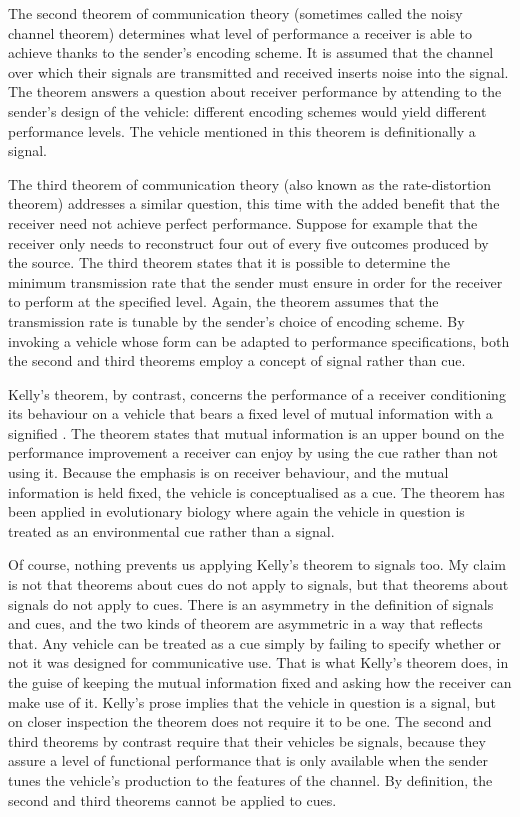 The second theorem of communication theory (sometimes called the noisy channel theorem) determines what level of performance a receiver is able to achieve thanks to the sender's encoding scheme.
It is assumed that the channel over which their signals are transmitted and received inserts noise into the signal.
The theorem answers a question about receiver performance by attending to the sender's design of the vehicle: different encoding schemes would yield different performance levels.
The vehicle mentioned in this theorem is definitionally a signal.

The third theorem of communication theory (also known as the rate-distortion theorem) addresses a similar question, this time with the added benefit that the receiver need not achieve perfect performance.
Suppose for example that the receiver only needs to reconstruct four out of every five outcomes produced by the source.
The third theorem states that it is possible to determine the minimum transmission rate that the sender must ensure in order for the receiver to perform at the specified level.
Again, the theorem assumes that the transmission rate is tunable by the sender's choice of encoding scheme.
By invoking a vehicle whose form can be adapted to performance specifications, both the second and third theorems employ a concept of signal rather than cue.

Kelly's theorem, by contrast, concerns the performance of a receiver conditioning its behaviour on a vehicle that bears a fixed level of mutual information with a signified \citep{kelly1956new}.
The theorem states that mutual information is an upper bound on the performance improvement a receiver can enjoy by using the cue rather than not using it.
Because the emphasis is on receiver behaviour, and the mutual information is held fixed, the vehicle is conceptualised as a cue.
The theorem has been applied in evolutionary biology \citep{donaldson-matasci2010fitness} where again the vehicle in question is treated as an environmental cue rather than a signal.

Of course, nothing prevents us applying Kelly's theorem to signals too.
My claim is not that theorems about cues do not apply to signals, but that theorems about signals do not apply to cues.
There is an asymmetry in the definition of signals and cues, and the two kinds of theorem are asymmetric in a way that reflects that.
Any vehicle can be treated as a cue simply by failing to specify whether or not it was designed for communicative use.
That is what Kelly's theorem does, in the guise of keeping the mutual information fixed and asking how the receiver can make use of it.
Kelly's prose implies that the vehicle in question is a signal, but on closer inspection the theorem does not require it to be one.
The second and third theorems by contrast require that their vehicles be signals, because they assure a level of functional performance that is only available when the sender tunes the vehicle's production to the features of the channel.
By definition, the second and third theorems cannot be applied to cues.

